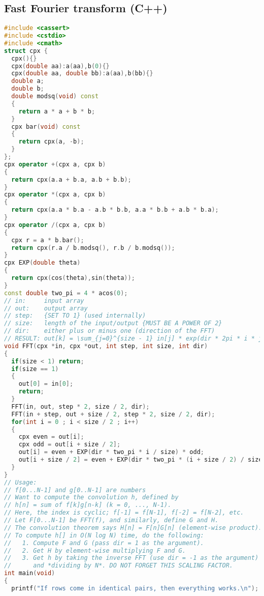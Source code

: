 \subsection{Fast Fourier transform (C++)}
\begin{lstlisting}[language=C++]
#include <cassert>
#include <cstdio>
#include <cmath>
struct cpx {
  cpx(){}
  cpx(double aa):a(aa),b(0){}
  cpx(double aa, double bb):a(aa),b(bb){}
  double a;
  double b;
  double modsq(void) const
  {
    return a * a + b * b;
  }
  cpx bar(void) const
  {
    return cpx(a, -b);
  }
};
cpx operator +(cpx a, cpx b)
{
  return cpx(a.a + b.a, a.b + b.b);
}
cpx operator *(cpx a, cpx b)
{
  return cpx(a.a * b.a - a.b * b.b, a.a * b.b + a.b * b.a);
}
cpx operator /(cpx a, cpx b)
{
  cpx r = a * b.bar();
  return cpx(r.a / b.modsq(), r.b / b.modsq());
}
cpx EXP(double theta)
{
  return cpx(cos(theta),sin(theta));
}
const double two_pi = 4 * acos(0);
// in:     input array
// out:    output array
// step:   {SET TO 1} (used internally)
// size:   length of the input/output {MUST BE A POWER OF 2}
// dir:    either plus or minus one (direction of the FFT)
// RESULT: out[k] = \sum_{j=0}^{size - 1} in[j] * exp(dir * 2pi * i * j * k / size)
void FFT(cpx *in, cpx *out, int step, int size, int dir)
{
  if(size < 1) return;
  if(size == 1)
  {
    out[0] = in[0];
    return;
  }
  FFT(in, out, step * 2, size / 2, dir);
  FFT(in + step, out + size / 2, step * 2, size / 2, dir);
  for(int i = 0 ; i < size / 2 ; i++)
  {
    cpx even = out[i];
    cpx odd = out[i + size / 2];
    out[i] = even + EXP(dir * two_pi * i / size) * odd;
    out[i + size / 2] = even + EXP(dir * two_pi * (i + size / 2) / size) * odd;
  }
}
// Usage:
// f[0...N-1] and g[0..N-1] are numbers
// Want to compute the convolution h, defined by
// h[n] = sum of f[k]g[n-k] (k = 0, ..., N-1).
// Here, the index is cyclic; f[-1] = f[N-1], f[-2] = f[N-2], etc.
// Let F[0...N-1] be FFT(f), and similarly, define G and H.
// The convolution theorem says H[n] = F[n]G[n] (element-wise product).
// To compute h[] in O(N log N) time, do the following:
//   1. Compute F and G (pass dir = 1 as the argument).
//   2. Get H by element-wise multiplying F and G.
//   3. Get h by taking the inverse FFT (use dir = -1 as the argument)
//      and *dividing by N*. DO NOT FORGET THIS SCALING FACTOR.
int main(void)
{
  printf("If rows come in identical pairs, then everything works.\n");
  

\end{lstlisting}
